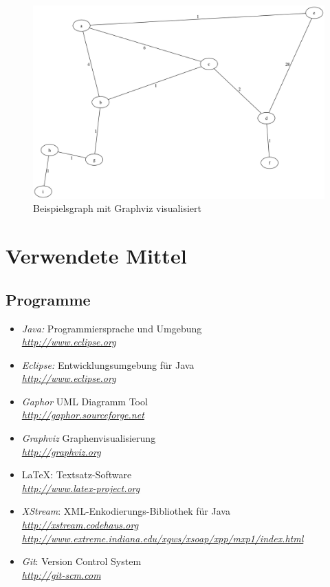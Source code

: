 \documentclass[a4paper,titlepage]{article}
\begin{document}
\begin{figure}[h!]
\begin{center}
\includegraphics[width=\textwidth]{screenshot/example_dot.png}
\end{center}
\caption{Beispielsgraph mit Graphviz visualisiert}
\end{figure}

\newpage

\section{Verwendete Mittel}

\subsection{Programme}

\begin{itemize}
\item \emph{Java:} Programmiersprache und Umgebung \\
	\emph{\href{http://www.eclipse.org}{http://www.eclipse.org}}
	\item \emph{Eclipse:} Entwicklungsumgebung für Java \\
		\emph{\href{http://www.eclipse.org}{http://www.eclipse.org}}
\item \emph{Gaphor} UML Diagramm Tool \\
	\emph{\href{http://gaphor.sourceforge.net}{http://gaphor.sourceforge.net}}
\item \emph{Graphviz} Graphenvisualisierung \\
	\emph{\href{http://graphviz.org}{http://graphviz.org}}
\item \LaTeX: Textsatz-Software \\
	\emph{\href{http://www.latex-project.org}{http://www.latex-project.org}}
\item \emph{XStream}: XML-Enkodierungs-Bibliothek für Java \\
	\emph{\href{http://xstream.codehaus.org}{http://xstream.codehaus.org}} \\
	\emph{\href{http://www.extreme.indiana.edu/xgws/xsoap/xpp/mxp1/index.html}{http://www.extreme.indiana.edu/xgws/xsoap/xpp/mxp1/index.html}}
\item \emph{Git}: Version Control System  \\
	\emph{\href{http://git-scm.com}{http://git-scm.com}}
\end{itemize}
\end{document}
